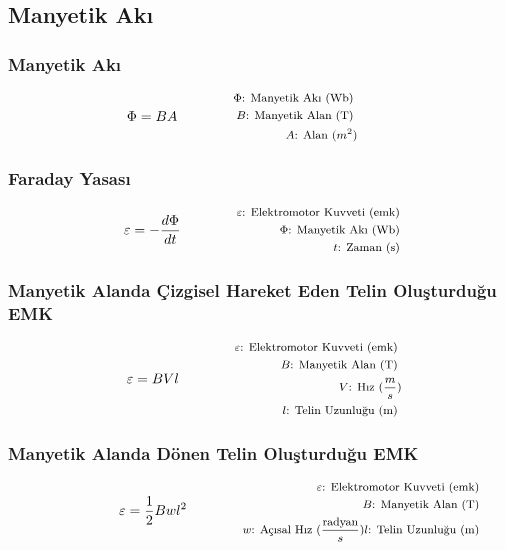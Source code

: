 \subsection{Manyetik Akı}

\subsubsection*{Manyetik Akı}
\begin{equation}
    \Phi = B A \qquad \qquad \parbox{4cm}{\footnotesize$\begin{aligned}
        \Phi\text{: Manyetik Akı (Wb) } \\
        B\text{: Manyetik Alan (T) } \\
        A\text{: Alan } (m^2)
\end{aligned}$}
\end{equation}

\subsubsection*{Faraday Yasası}
\begin{equation}
    \varepsilon = - \frac{d\Phi}{dt} \qquad \qquad \parbox{4cm}{\footnotesize$\begin{aligned}
        \varepsilon\text{: Elektromotor Kuvveti (emk) } \\
        \Phi\text{: Manyetik Akı (Wb) } \\
        t\text{: Zaman (s) }
\end{aligned}$}
\end{equation}

\subsubsection*{Manyetik Alanda Çizgisel Hareket Eden Telin Oluşturduğu EMK}
\begin{equation}
    \varepsilon = BVl \qquad \qquad \parbox{4cm}{\footnotesize$\begin{aligned}
        \varepsilon\text{: Elektromotor Kuvveti (emk) } \\
        B\text{: Manyetik Alan (T) } \\
        V\text{: Hız } (\frac{m}{s}) \\
        l\text{: Telin Uzunluğu (m) }
\end{aligned}$}
\end{equation}

\subsubsection*{Manyetik Alanda Dönen Telin Oluşturduğu EMK}
\begin{equation}
    \varepsilon = \frac{1}{2} Bwl^2 \qquad \qquad \parbox{4cm}{\footnotesize$\begin{aligned}
        \varepsilon\text{: Elektromotor Kuvveti (emk) } \\
        B\text{: Manyetik Alan (T) } \\
        w\text{: Açısal Hız } (\frac{\text{radyan}}{s})
        l\text{: Telin Uzunluğu (m) }
\end{aligned}$}
\end{equation}

